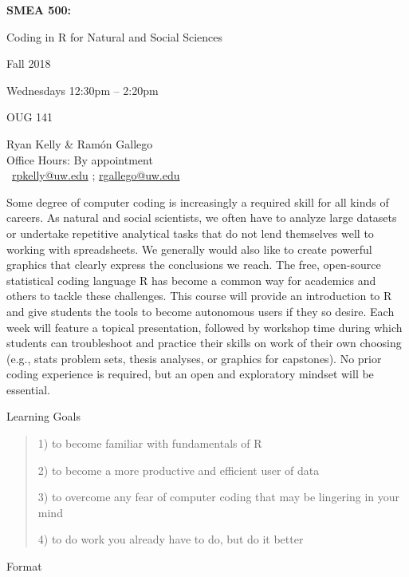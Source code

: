 \documentclass[11pt,letterpaper]{article}
\newcommand{\R}[0]{\textsf{R }}
\begin{document}
\begin{center} 
 {\titlefont
		
		\Huge
		\textbf{SMEA 500:}
		
		Coding in \R for Natural and Social Sciences
}

\large
Fall 2018
	
Wednesdays 12:30pm -- 2:20pm

OUG 141

{\titlefont
		Ryan Kelly \& Ramón Gallego\\
		Office Hours: By appointment\\
		\Letter\ \href{mailto:rpkelly@uw.edu}{rpkelly@uw.edu} ; \href{mailto:rgallego@uw.edu}{rgallego@uw.edu}		
}

\end{center}
\setlength{\parskip}{1em}


Some degree of computer coding is increasingly a required skill for all kinds of careers. As natural and social scientists, we often have to analyze large datasets or undertake repetitive analytical tasks that do not lend themselves well to working with spreadsheets. We generally would also like to create powerful graphics that clearly express the conclusions we reach. The free, open-source statistical coding language \R has become a common way for academics and others to tackle these challenges. This course will provide an introduction to \R and give students the tools to become autonomous users if they so desire. Each week will feature a topical presentation, followed by workshop time during which students can troubleshoot and practice their skills on work of their own choosing (e.g., stats problem sets, thesis analyses, or graphics for capstones). No prior coding experience is required, but an open and exploratory mindset will be essential. 

\vspace{1em}

{\Large Learning Goals}\hrulefill
\begin{quote} %

1) to become familiar with fundamentals of \R

2) to become a more productive and efficient user of data

3) to overcome any fear of computer coding that may be lingering in your mind

4) to do work you already have to do, but do it better
\end{quote}
{\Large Format}\hrulefill
\end{document}
